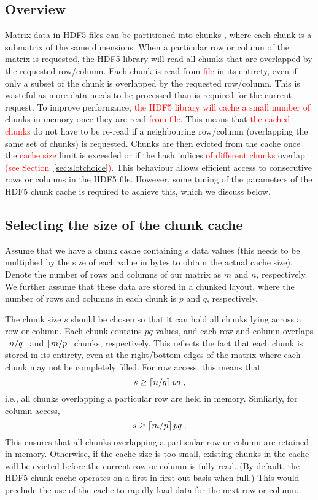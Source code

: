 \documentclass{article}
\newcommand{\revised}[1]{\textcolor{red}{#1}}
\begin{document}
\subsection{Overview}
Matrix data in HDF5 files can be partitioned into chunks \cite{hdf5chunk}, where each chunk is a submatrix of the same dimensions.
When a particular row or column of the matrix is requested, the HDF5 library will read all chunks that are overlapped by the requested row/column.
Each chunk is read from \revised{file} in its entirety, even if only a subset of the chunk is overlapped by the requested row/column.
This is wasteful as more data needs to be processed than is required for the current request.
To improve performance, \revised{the HDF5 library will cache a small number of} chunks in memory once they are read \revised{from file}.
This means that \revised{the cached chunks} do not have to be re-read if a neighbouring row/column (overlapping the same set of chunks) is requested.
Chunks are then evicted from the cache once the \revised{cache size} limit is exceeded or if the hash indices \revised{of different chunks} overlap \revised{(see Section~\ref{sec:slotchoice})}.
This behaviour allows efficient access to consecutive rows or columns in the HDF5 file.
However, some tuning of the parameters of the HDF5 chunk cache is required to achieve this, which we discuss below.

\subsection{Selecting the size of the chunk cache}
Assume that we have a chunk cache containing $s$ data values (this needs to be multiplied by the size of each value in bytes to obtain the actual cache size).
Denote the number of rows and columns of our matrix as $m$ and $n$, respectively. 
We further assume that these data are stored in a chunked layout, where the number of rows and columns in each chunk is $p$ and $q$, respectively.

The chunk size $s$ should be chosen so that it can hold all chunks lying across a row or column.
Each chunk contains $pq$ values, and each row and column overlaps $\left \lceil n/q \right \rceil$ and $\left \lceil m/p \right \rceil$ chunks, respectively.
This reflects the fact that each chunk is stored in its entirety, even at the right/bottom edges of the matrix where each chunk may not be completely filled.
For row access, this means that 
\begin{equation}
s \ge \left \lceil n/q \right \rceil pq \;, 
\end{equation}
i.e., all chunks overlapping a particular row are held in memory. Simliarly, for column access, 
\begin{equation}
s \ge \left \lceil m/p \right \rceil pq \;.
\end{equation}
This ensures that all chunks overlapping a particular row or column are retained in memory.
Otherwise, if the cache size is too small, existing chunks in the cache will be evicted before the current row or column is fully read.
(By default, the HDF5 chunk cache operates on a first-in-first-out basis when full.)
This would preclude the use of the cache to rapidly load data for the next row or column.
\end{document}
